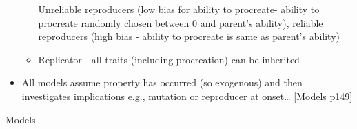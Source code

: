 \begin{itemize}
\begin{itemize}
		Unreliable reproducers (low bias for ability to procreate- ability
		to procreate randomly chosen between 0 and parent's ability),
		reliable reproducers (high bias - ability to procreate is same as
		parent's ability)
		
		\item
		
		Replicator - all traits (including procreation) can be inherited
		
	\end{itemize}
	\item
	
	All models assume property has occurred (so exogenous) and then
	investigates implications e.g., mutation or reproducer at
	onset\ldots{} {[}Models p149{]}
		
\end{itemize}

Models

